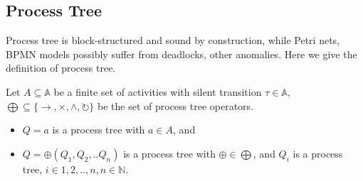 \subsection{Process Tree}
Process tree is block-structured and sound by construction, while Petri nets, BPMN models possibly suffer from deadlocks, other anomalies\cite{van2016data}. Here we give the definition of process tree.
\begin{definition}
Let $ A \subseteq \mathbb{A} $ be a finite set of activities with silent transition $\tau \in \mathbb{A}$, $\bigoplus \subseteq \{\rightarrow, \times, \land, \circlearrowright\}$ be the set of process tree operators. 
\begin{itemize}
\item $Q=a$ is a process tree with $a\in A$, and 
\item $Q= \oplus (Q_1 , Q_2 ,.. Q_n)$ is a process tree with $\oplus \in \bigoplus$, and $Q_i$ is a process tree, $i\in{1,2,..,n}, n\in \mathbb{N}$. 
\end{itemize}
\end{definition}

